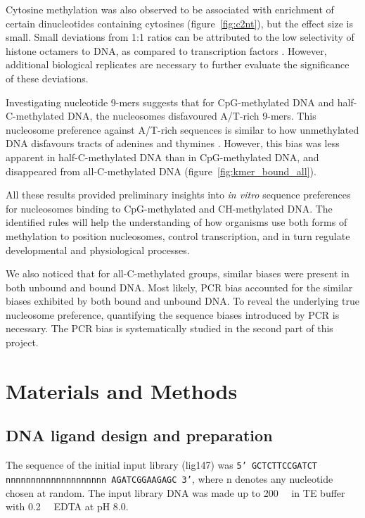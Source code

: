 \documentclass[a4paper, numbers=noenddot]{scrbook}
\begin{document}
Cytosine methylation was also observed to be associated with enrichment of certain dinucleotides containing cytosines (figure~\ref{fig:c2nt}), but the effect size is small.  Small deviations from 1:1 ratios can be attributed to the low selectivity of histone octamers to DNA, as compared to transcription factors \citep{struhl_determinants_2013}. %
However, additional biological replicates are necessary to further evaluate the significance of these deviations.

Investigating nucleotide 9-mers suggests that for CpG-methylated DNA and half-C-methylated DNA, the nucleosomes disfavoured A/T-rich 9-mers.  This nucleosome preference against A/T-rich sequences is similar to how unmethylated DNA disfavours tracts of adenines and thymines \citep{struhl_determinants_2013}. However, this bias was less apparent in half-C-methylated DNA than in CpG-methylated DNA, and disappeared from all-C-methylated DNA (figure~\ref{fig:kmer_bound_all}).

All these results provided preliminary insights into \emph{in vitro} sequence preferences for nucleosomes binding to CpG-methylated and CH-methylated DNA.  The identified rules will help the understanding of how organisms use both forms of methylation to position nucleosomes, control transcription, and in turn regulate developmental and physiological processes.

We also noticed that for all-C-methylated groups, similar biases were present in both unbound and bound DNA.  Most likely, PCR bias accounted for the similar biases exhibited by both bound and unbound DNA.  To reveal the underlying true nucleosome preference, quantifying the sequence biases introduced by PCR is necessary.  The PCR bias is systematically studied in the second part of this project.

\section{Materials and Methods}
\label{sec:emsaselex_methods}

\subsection{DNA ligand design and preparation}
\label{ssec:emsaselex_methods_lig}

The sequence of the initial input library (lig147) was \texttt{5' GCTCTTCCGATCT nnnnnnnnn\-nnnnnnnnnnn AGATCGGAAGAGC 3'}, where n denotes any nucleotide chosen at random. The input library DNA was made up to \SI{200}{\nano\Molar} in TE buffer with \SI{0.2}{\milli\Molar} EDTA at pH 8.0.
\end{document}
